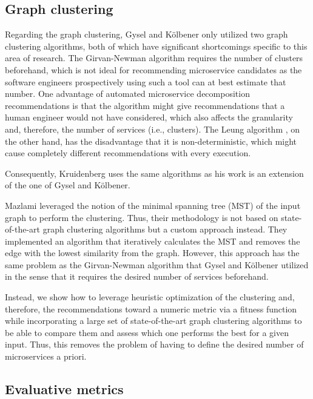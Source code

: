 \documentclass[12pt,a4paper]{report}
\begin{document}
\subsection{Graph clustering}

Regarding the graph clustering, Gysel and K{\"o}lbener \cite{gysel2016service}
only utilized two graph clustering algorithms, both of which have significant
shortcomings specific to this area of research. The Girvan-Newman algorithm
\cite{girvan2002community} requires the number of clusters beforehand, which is
not ideal for recommending microservice candidates as the software engineers
prospectively using such a tool can at best estimate that number.
One advantage of automated microservice decomposition recommendations is that
the algorithm might give recommendations that a human engineer would not have
considered, which also affects the granularity and, therefore, the number of
services (i.e., clusters). The Leung algorithm \cite{leung2009community}, on
the other hand, has the disadvantage that it is non\hyp deterministic, which
might cause completely different recommendations with every execution.

Consequently, Kruidenberg \cite{kruidenberg2018monoliths} uses the same
algorithms as his work is an extension of the one of Gysel and K{\"o}lbener.

Mazlami \cite{mazlami2017extraction} leveraged the notion of the minimal
spanning tree (MST) of the input graph to perform the clustering. Thus, their
methodology is not based on state-of-the-art graph clustering algorithms but a
custom approach instead. They implemented an algorithm that iteratively
calculates the MST and removes the edge with the lowest similarity from the
graph. However, this approach has the same problem as the Girvan-Newman
algorithm \cite{girvan2002community} that Gysel and K{\"o}lbener utilized in
the sense that it requires the desired number of services beforehand.

Instead, we show how to leverage heuristic optimization of the clustering and,
therefore, the recommendations toward a numeric metric via a fitness function
while incorporating a large set of state-of-the-art graph clustering algorithms
to be able to compare them and assess which one performs the best for a given
input. Thus, this removes the problem of having to define the desired number of
microservices a priori.


\subsection{Evaluative metrics}
\end{document}
